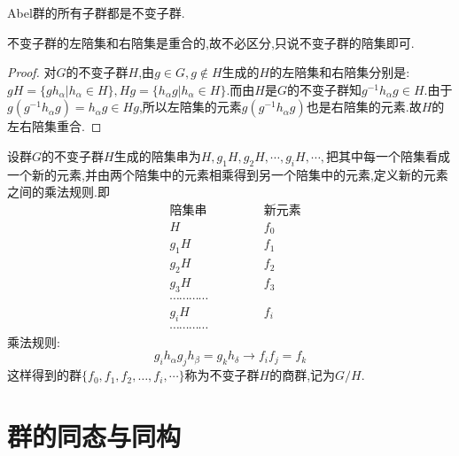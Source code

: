  Abel群的所有子群都是不变子群.
 
 不变子群的左陪集和右陪集是重合的,故不必区分,只说不变子群的陪集即可.
\begin{proof}
    对$G$的不变子群$H$,由$g \in G,g \notin H$生成的$H$的左陪集和右陪集分别是:$gH=\{gh_\alpha|h_\alpha \in H \},Hg=\{h_\alpha g|h_\alpha \in H\}$.而由$H$是$G$的不变子群知$g^{-1}h_\alpha g\in H$.由于$g(g^{-1}h_\alpha g)=h_\alpha g \in Hg$,所以左陪集的元素$g(g^{-1}h_\alpha g)$也是右陪集的元素.故$H$的左右陪集重合.
\end{proof}
\begin{definition}[商群]
设群$G$的不变子群$H$生成的陪集串为$H,g_1H,g_2H,\cdots,g_iH,\cdots,$把其中每一个陪集看成一个新的元素,并由两个陪集中的元素相乘得到另一个陪集中的元素,定义新的元素之间的乘法规则.即
$$
\begin{aligned}
    &\text{陪集串}\quad  &\quad\quad&\text{新元素}\\
    &H    &   &f_0\\
    &g_1H &   &f_1\\
    &g_2H  &  &f_2\\
    &g_3H  &  &f_3\\
   &\cdots \cdots \cdots \cdots\\
    &g_iH  &     &f_i\\
  &  \cdots \cdots \cdots \cdots
\end{aligned}
$$
乘法规则:$$g_ih_\alpha g_j h_\beta=g_kh_\delta \longrightarrow f_if_j=f_k$$
这样得到的群$\{f_0,f_1,f_2,\dots,f_i,\cdots\}$称为不变子群$H$的商群,记为$G/H$.
\end{definition}
\section{群的同态与同构}